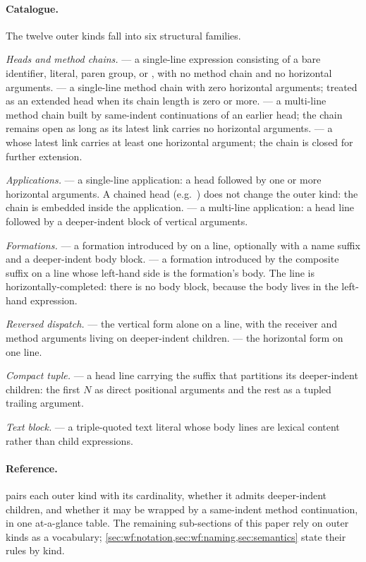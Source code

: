 \paragraph{Catalogue.}
The twelve outer kinds fall into six structural families.

\emph{Heads and method chains.}
 --- a single-line expression consisting of a bare identifier,
  literal, paren group, or \ff{*}, with no method chain and no
  horizontal arguments.
 --- a single-line method chain  with
  zero horizontal arguments;
  treated as an extended head when its chain length is zero or more.
 --- a multi-line method chain built by same-indent
   continuations of an earlier head;
  the chain remains open as long as its latest  link
  carries no horizontal arguments.
 --- a  whose latest 
  link carries at least one horizontal argument;
  the chain is closed for further extension.

\emph{Applications.}
 --- a single-line application: a head followed by one
  or more horizontal arguments.
A chained head (e.g.\ ) does not change the outer kind:
  the chain is embedded inside the application.
 --- a multi-line application: a head line followed by
  a deeper-indent block of vertical arguments.

\emph{Formations.}
 --- a formation introduced by \ff{[params]} on a
  line, optionally with a name suffix and a deeper-indent body block.
 --- a formation introduced by the composite
  suffix  on a line whose left-hand side is the
  formation's body.
The line is horizontally-completed: there is no body block, because the
  body lives in the left-hand expression.

\emph{Reversed dispatch.}
 --- the vertical form  alone on a line,
  with the receiver and method arguments living on deeper-indent
  children.
 --- the horizontal form
   on one line.

\emph{Compact tuple.}
 --- a head line carrying the suffix  that
  partitions its deeper-indent children: the first \(N\) as direct
  positional arguments and the rest as a tupled trailing argument.

\emph{Text block.}
 --- a triple-quoted text literal whose body lines are
  lexical content rather than child expressions.

\paragraph{Reference.}
 pairs each outer kind with its cardinality,
  whether it admits deeper-indent children, and whether it may be
  wrapped by a same-indent method continuation, in one at-a-glance
  table.
The remaining sub-sections of this paper rely on outer kinds as a
  vocabulary;
  \cref{sec:wf:notation,sec:wf:naming,sec:semantics} state their rules
  by kind.
